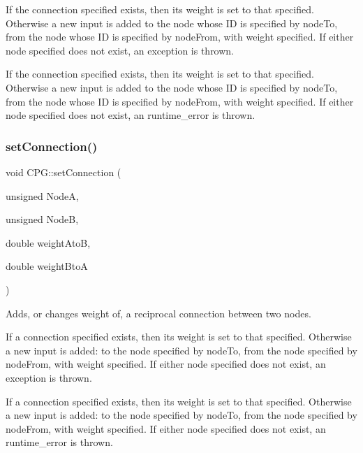 If the connection specified exists, then its weight is set to that specified. Otherwise a new input is added to the node whose ID is specified by node\+To, from the node whose ID is specified by node\+From, with weight specified. If either node specified does not exist, an exception is thrown.

If the connection specified exists, then its weight is set to that specified. Otherwise a new input is added to the node whose ID is specified by node\+To, from the node whose ID is specified by node\+From, with weight specified. If either node specified does not exist, an runtime\+\_\+error is thrown. \mbox{\label{classCPG_a4e79271993dfecd92445e9abfd4be9aa}} 
\subsubsection{\texorpdfstring{set\+Connection()}{setConnection()}\hspace{0.1cm}{\footnotesize\ttfamily [2/2]}}
{\footnotesize\ttfamily void C\+P\+G\+::set\+Connection (\begin{DoxyParamCaption}\item[{unsigned}]{NodeA,  }\item[{unsigned}]{NodeB,  }\item[{double}]{weight\+AtoB,  }\item[{double}]{weight\+BtoA }\end{DoxyParamCaption})}



Adds, or changes weight of, a reciprocal connection between two nodes. 

If a connection specified exists, then its weight is set to that specified. Otherwise a new input is added\+: to the node specified by node\+To, from the node specified by node\+From, with weight specified. If either node specified does not exist, an exception is thrown.

If a connection specified exists, then its weight is set to that specified. Otherwise a new input is added\+: to the node specified by node\+To, from the node specified by node\+From, with weight specified. If either node specified does not exist, an runtime\+\_\+error is thrown. \mbox{\label{classCPG_ac51f362e189d966e7c733ba1624d0fc1}} 
